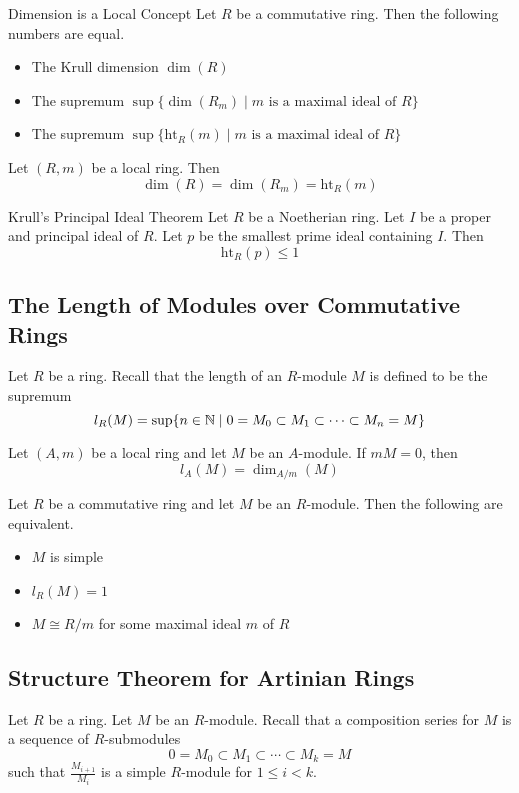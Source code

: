 \documentclass[a4paper]{article}
\begin{document}
\begin{prp}{Dimension is a Local Concept}{} Let $R$ be a commutative ring. Then the following numbers are equal. 
\begin{itemize}
\item The Krull dimension $\dim(R)$
\item The supremum $\sup\{\dim(R_m)\;|\;m\text{ is a maximal ideal of }R\}$
\item The supremum $\sup\{\text{ht}_R(m)\;|\;m\text{ is a maximal ideal of }R\}$
\end{itemize}
\end{prp}

\begin{crl}{}{} Let $(R,m)$ be a local ring. Then $$\dim(R)=\dim(R_m)=\text{ht}_R(m)$$
\end{crl}

\begin{thm}{Krull's Principal Ideal Theorem}{} Let $R$ be a Noetherian ring. Let $I$ be a proper and principal ideal of $R$. Let $p$ be the smallest prime ideal containing $I$. Then $$\text{ht}_R(p)\leq 1$$
\end{thm}

\subsection{The Length of Modules over Commutative Rings}
Let $R$ be a ring. Recall that the length of an $R$-module $M$ is defined to be the supremum $$l_R(M)=\text{sup}\{n\in\mathbb{N}\;|\;0=M_0\subset M_1\subset\cdots\subset M_n=M\}$$

\begin{lmm}{}{} Let $(A,m)$ be a local ring and let $M$ be an $A$-module. If $mM=0$, then $$l_A(M)=\dim_{A/m}(M)$$
\end{lmm}

\begin{prp}{}{} Let $R$ be a commutative ring and let $M$ be an $R$-module. Then the following are equivalent. 
\begin{itemize}
\item $M$ is simple
\item $l_R(M)=1$
\item $M\cong R/m$ for some maximal ideal $m$ of $R$
\end{itemize}
\end{prp}

\subsection{Structure Theorem for Artinian Rings}
Let $R$ be a ring. Let $M$ be an $R$-module. Recall that a composition series for $M$ is a sequence of $R$-submodules $$0=M_0\subset M_1\subset\cdots\subset M_k=M$$ such that $\frac{M_{i+1}}{M_i}$ is a simple $R$-module for $1\leq i<k$. 
\end{document}

